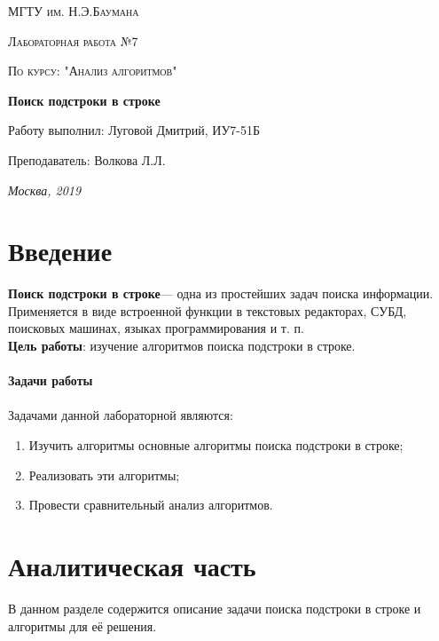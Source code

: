 \documentclass[a4paper,12pt]{report}
\begin{document}
\begin{titlepage}
	\centering
	{\scshape\LARGE МГТУ им. Н.Э.Баумана \par}
	\vspace{4cm}
	{\scshape\Large Лабораторная работа №7\par}
	\vspace{0.5cm}	
	{\scshape\Large По курсу: "Анализ алгоритмов"\par}
	\vspace{2cm}
	{\huge\bfseries Поиск подстроки в строке\par}
	\vspace{3cm}
	\Large Работу выполнил: Луговой Дмитрий, ИУ7-51Б\par
	\vspace{0.5cm}
	\Large Преподаватель:  Волкова Л.Л.\par

	\vfill
	\large \textit {Москва, 2019} \par
\end{titlepage}

\setcounter{page}{2}

\tableofcontents

\newpage
\chapter*{Введение}
\hspace{0.6cm}  \textbf{Поиск подстроки в строке}— одна из простейших задач поиска информации. Применяется в виде встроенной функции в текстовых редакторах, СУБД, поисковых машинах, языках программирования и т. п.\\

\textbf{Цель работы}: изучение алгоритмов поиска подстроки в строке.\\\\

\textbf{\LARGE Задачи работы}\\\\
Задачами данной лабораторной являются:
\begin{enumerate}
\item Изучить алгоритмы основные алгоритмы поиска подстроки в строке;
\item Реализовать эти алгоритмы;
\item Провести сравнительный анализ алгоритмов.
\end{enumerate}

\chapter{Аналитическая часть}
\hspace{0.6cm}В данном разделе содержится описание задачи поиска подстроки в строке и алгоритмы для её решения.
\end{document}
